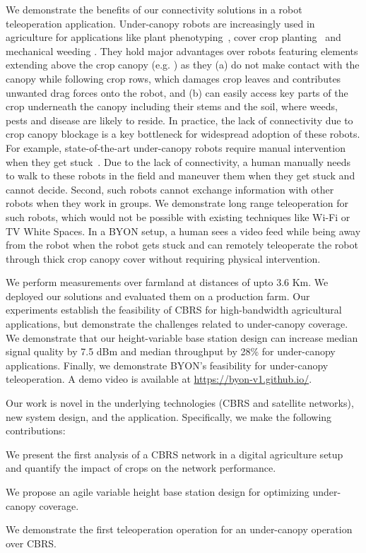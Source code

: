 We demonstrate the benefits of our connectivity solutions in a robot teleoperation application. Under-canopy robots are increasingly used in agriculture for applications like plant phenotyping~\cite{phenotyping1,sivakumar_learned_2021,manish_agbug_2021,kim_p-agbot_2022}, cover crop planting~\cite{icover_usda, farmprogress_robot, du_deep-cnn_2022} and mechanical weeding \cite{naio_oz, mcallister_agbots_2020, reiser_development_2019}. They hold major advantages over robots featuring elements extending above the crop canopy (e.g. \cite{mineral_rover,xiang_fieldbased_2023,xu_modular_2022}) as they (a) do not make contact with the canopy while following crop rows, which damages crop leaves and contributes unwanted drag forces onto the robot, and (b) can easily access key parts of the crop underneath the canopy including their stems and the soil, where weeds, pests and disease are likely to reside. %
In practice, the lack of connectivity due to crop canopy blockage is a key bottleneck for widespread adoption of these robots. For example, state-of-the-art under-canopy robots require manual intervention when they get stuck~\cite{sivakumar_learned_2021, velasquez_multi-sensor_2022,gasparino_cropnav_2023}. Due to the lack of connectivity, a human manually needs to walk to these robots in the field and maneuver them when they get stuck and cannot decide. Second, such robots cannot exchange information with other robots when they work in groups. We demonstrate long range teleoperation for such robots, which would not be possible with existing techniques like Wi-Fi or TV White Spaces. In a BYON setup, a human sees a video feed while being away from the robot when the robot gets stuck and can remotely teleoperate the robot through thick crop canopy cover without requiring physical intervention.

We perform measurements over farmland at distances of upto 3.6 Km. We deployed our solutions and evaluated them on a production farm. Our experiments establish the feasibility of CBRS for high-bandwidth agricultural applications, but demonstrate the challenges related to under-canopy coverage. We demonstrate that our height-variable base station design can increase median signal quality by 7.5 dBm and median throughput by 28\% for under-canopy applications. Finally, we demonstrate BYON's feasibility for under-canopy teleoperation. A demo video is available at \href{https://byon-v1.github.io/}{\color{blue}https://byon-v1.github.io/}.

Our work is novel in the underlying technologies (CBRS and satellite networks), new system design, and the application. Specifically, we make the following contributions:
\squishlist
    \item We present the first analysis of a CBRS network in a digital agriculture setup and quantify the impact of crops on the network performance. 
    \item We propose an agile variable height base station design for optimizing under-canopy coverage.
    \item We demonstrate the first teleoperation operation for an under-canopy operation over CBRS.
\squishend
